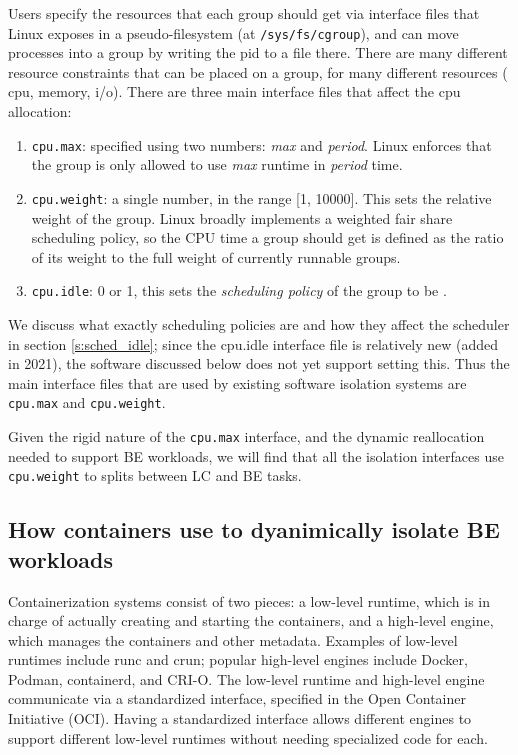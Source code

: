 Users specify the resources that each group should get via interface files that
Linux exposes in a pseudo-filesystem (at \texttt{/sys/fs/cgroup}), and can move
processes into a group by writing the pid to a file there. There are many
different resource constraints that can be placed on a group, for many different
resources (\eg{} cpu, memory, i/o). There are three main interface files that
affect the cpu allocation:
\begin{enumerate}
    \item \texttt{cpu.max}: specified using two numbers: \textit{max} and \textit{period}. Linux
    enforces that the group is only allowed to use \textit{max} runtime in \textit{period} time.
    \item \texttt{cpu.weight}: a single number, in the range [1, 10000]. This
    sets the relative weight of the group. Linux broadly implements a weighted fair
    share scheduling policy, so the CPU time a group should get is defined as
    the ratio of its weight to the full weight of currently runnable groups.
    \item \texttt{cpu.idle}: 0 or 1, this sets the \textit{scheduling policy} of
    the group to be \schedidle{}.
\end{enumerate}

We discuss what exactly scheduling policies are and how they affect the
scheduler in section \ref{s:sched_idle}; since the cpu.idle \cgroups{}
interface file is relatively new (added in 2021), the software discussed below
does not yet support setting this. Thus the main interface files that are used
by existing software isolation systems are \texttt{cpu.max} and
\texttt{cpu.weight}.

Given the rigid nature of the \texttt{cpu.max} interface, and the dynamic
reallocation needed to support BE workloads, we will find that all the isolation
interfaces use \texttt{cpu.weight} to splits between LC and BE tasks.

\subsection{How containers use \cgroups{} to dyanimically isolate BE workloads}

Containerization systems consist of two pieces: a low-level runtime, which is in
charge of actually creating and starting the containers, and a high-level
engine, which manages the containers and other metadata. Examples of low-level
runtimes include runc and crun; popular high-level engines include Docker,
Podman, containerd, and CRI-O. The low-level runtime and high-level engine
communicate via a standardized interface, specified in the Open Container
Initiative (OCI). Having a standardized interface allows different engines to
support different low-level runtimes without needing specialized code for each.


